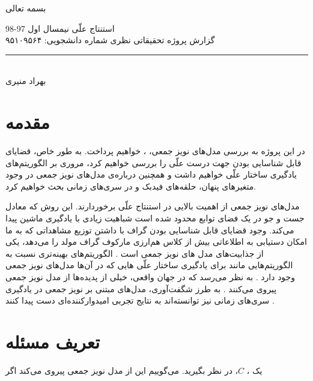 \documentclass[a4paper,12pt]{article}
\begin{document}
\begin{center}
بسمه تعالی
\end{center}
\begin{large}
استنتاج علّی
\hspace{10.3cm}
نیمسال اول 97-98
\\
گزارش پروژه تحقیقاتی نظری\hspace{8cm}  شماره دانشجویی:  ۹۵۱۰۹۵۶۴
\end{large}

\noindent\rule{\textwidth}{1pt}
\begin{center}
\begin{large}
\textbf{}\\
\vspace{0.5cm}
بهراد منیری
\end{large}
\end{center}


\section{مقدمه}
در این پروژه به بررسی مدل‌های نویز جمعی،
،
خواهیم پرداخت. به طور خاص، قضایای قابل شناسایی بودن جهت درست علّی  را بررسی خواهیم کرد، مروری بر الگوریتم‌های یادگیری  ساختار‌ علّی خواهیم داشت و همچنین درباره‌ی مدل‌های نویز جمعی در وجود متغیر‌های پنهان، حلقه‌‌های فیدبک و در سری‌های زمانی بحث خواهیم کرد. 

مدل‌های نویز جمعی از اهمیت بالایی در استنتاج علّی برخوردارند.  این روش که معادل جست‌ و جو در یک فضای توابع محدود شده است شباهیت زیادی با یادگیری ماشین پیدا می‌کند. وجود  قضایای قابل شناسایی بودن گراف  با داشتن توزیع مشاهداتی که به ما امکان دستیابی به اطلاعاتی بیش از کلاس هم‌ارزی مارکوف گراف مولد را می‌دهد، یکی از جذابیت‌های مدل های نویز جمعی است
\cite{hoyer}.
الگوریتم‌های بهینه‌تری نسبت به الگوریتم‌هایی مانند 
برای یادگیری ساختار علّی 
هایی که در آن‌ها مدل‌های نویز جمعی وجود دارد 
\cite{continous}.
به نظر می‌رسد که در جهان واقعی، خیلی از پدیده‌ها از مدل‌ نویز جمعی پیروی می‌کنند
\cite{continous, postnonlinear}.
 به طرز شگفت‌آوری، مدل‌های مبتنی بر نویز جمعی در یادگیری سری‌های زمانی نیز توانسته‌اند به نتایج تجربی امیدوارکننده‌ای دست پیدا کنند
\cite{time}.


\section{تعریف مسئله}

یک 
،
$C$،
در نظر بگیرید. می‌گوییم این 
از مدل نویز جمعی پیروی می‌کند اگر
	
\end{document}
